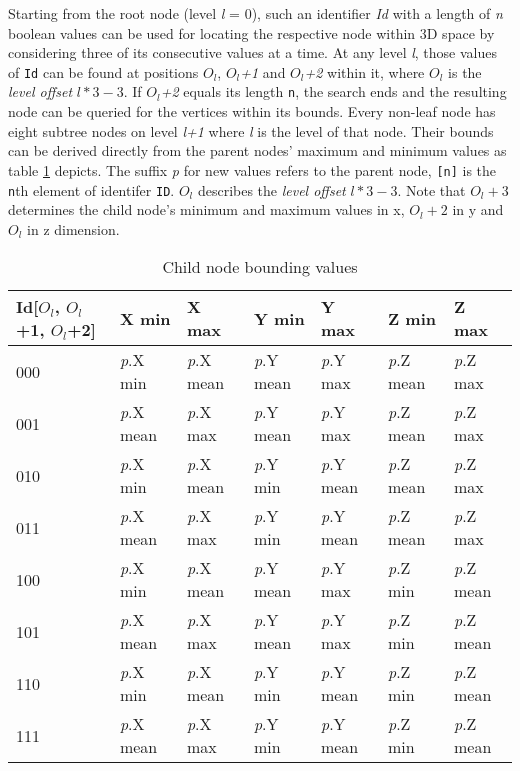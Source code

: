 Starting from the root node (level \textit{l} = 0), such an identifier \textit{Id} with a length of \textit{n} boolean values can be used for locating the respective node within 3D space by considering three of its consecutive values at a time. At any level \textit{l}, those  values of \texttt{Id} can be found at positions \textit{$O_l$}, \textit{$O_l$+1} and \textit{$O_l$+2} within it, where $O_l$ is the \textit{level offset} $l*3-3$. If \textit{$O_l$+2} equals its length \texttt{n}, the search ends and the resulting node can be queried for the vertices within its bounds. Every non-leaf node has eight subtree nodes on level \textit{l+1} where \textit{l} is the level of that node. Their bounds can be derived directly from the parent nodes' maximum and minimum values as table \ref{tab:child_node_bounding_values} depicts. The suffix \textit{p} for new values refers to the parent node, \texttt{[n]} is the \texttt{n}th element of identifer \texttt{ID}. $O_l$ describes the \textit{level offset} $l*3-3$. Note that \texttt{$O_l+3$} determines the child node's minimum and maximum values in x, \texttt{$O_l+2$} in y and \texttt{$O_l$} in z dimension.

\begin{table}[]
\begin{tabular}{l|llllll}
Id{[}$O_l$, $O_l$+1, $O_l$+2{]} & X min & X max & Y min & Y max & Z min & Z max \\ \hline
000 & \textit{p}.X min & \textit{p}.X mean & \textit{p}.Y mean & \textit{p}.Y max & \textit{p}.Z mean & \textit{p}.Z max \\
001 & \textit{p}.X mean & \textit{p}.X max & \textit{p}.Y mean & \textit{p}.Y max & \textit{p}.Z mean & \textit{p}.Z max \\
010 & \textit{p}.X min & \textit{p}.X mean & \textit{p}.Y min & \textit{p}.Y mean & \textit{p}.Z mean & \textit{p}.Z max \\
011 & \textit{p}.X mean & \textit{p}.X max & \textit{p}.Y min & \textit{p}.Y mean & \textit{p}.Z mean & \textit{p}.Z max \\
100 & \textit{p}.X min & \textit{p}.X mean & \textit{p}.Y mean & \textit{p}.Y max & \textit{p}.Z min & \textit{p}.Z mean \\
101 & \textit{p}.X mean & \textit{p}.X max & \textit{p}.Y mean & \textit{p}.Y max & \textit{p}.Z min & \textit{p}.Z mean \\
110 & \textit{p}.X min & \textit{p}.X mean & \textit{p}.Y min & \textit{p}.Y mean & \textit{p}.Z min & \textit{p}.Z mean \\
111 & \textit{p}.X mean & \textit{p}.X max & \textit{p}.Y min & \textit{p}.Y mean & \textit{p}.Z min & \textit{p}.Z mean
\end{tabular}
\caption{Child node bounding values}\label{tab:child_node_bounding_values}
\end{table}

